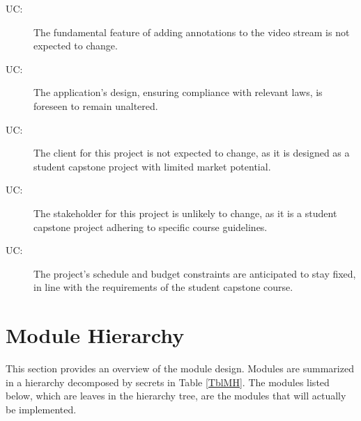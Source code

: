 \documentclass[12pt, titlepage]{article}
\newcounter{ucnum}
\newcommand{\uctheucnum}{UC\theucnum}
\begin{document}
\begin{description}
\item[ \uctheucnum:] The fundamental feature of adding annotations to the video stream is not expected to change.

\item[ \uctheucnum:] The application's design, ensuring compliance with relevant laws, is foreseen to remain unaltered.

\item[ \uctheucnum:] The client for this project is not expected to change, as it is designed as a student capstone project with limited market potential.

\item[ \uctheucnum:] The stakeholder for this project is unlikely to change, as it is a student capstone project adhering to specific course guidelines.

\item[ \uctheucnum:] The project's schedule and budget constraints are anticipated to stay fixed, in line with the requirements of the student capstone course.
\end{description}

\section{Module Hierarchy} \label{SecMH}

This section provides an overview of the module design. Modules are summarized
in a hierarchy decomposed by secrets in Table \ref{TblMH}. The modules listed
below, which are leaves in the hierarchy tree, are the modules that will
actually be implemented.
\end{document}
